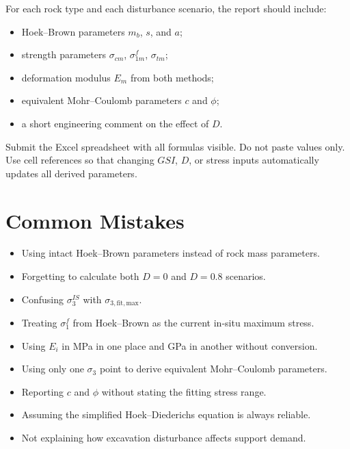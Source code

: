 \documentclass[a4paper,12pt]{article}
\begin{document}
\begin{calcbox}
For each rock type and each disturbance scenario, the report should include:
\begin{itemize}
    \item Hoek--Brown parameters \(m_b\), \(s\), and \(a\);
    \item strength parameters \(\sigma_{cm}\), \(\sigma_{1m}^f\), \(\sigma_{tm}\);
    \item deformation modulus \(E_m\) from both methods;
    \item equivalent Mohr--Coulomb parameters \(c\) and \(\phi\);
    \item a short engineering comment on the effect of \(D\).
\end{itemize}
\end{calcbox}

\begin{notebox}
Submit the Excel spreadsheet with all formulas visible. Do not paste values only. Use
cell references so that changing \(GSI\), \(D\), or stress inputs automatically updates all
derived parameters.
\end{notebox}

\section{Common Mistakes}

\begin{errbox}
\begin{itemize}
    \item Using intact Hoek--Brown parameters instead of rock mass parameters.
    \item Forgetting to calculate both \(D=0\) and \(D=0.8\) scenarios.
    \item Confusing \(\sigma_3^{IS}\) with \(\sigma_{3,\mathrm{fit,max}}\).
    \item Treating \(\sigma_1^f\) from Hoek--Brown as the current in-situ maximum stress.
    \item Using \(E_i\) in MPa in one place and GPa in another without conversion.
    \item Using only one \(\sigma_3\) point to derive equivalent Mohr--Coulomb parameters.
    \item Reporting \(c\) and \(\phi\) without stating the fitting stress range.
    \item Assuming the simplified Hoek--Diederichs equation is always reliable.
    \item Not explaining how excavation disturbance affects support demand.
\end{itemize}
\end{errbox}
\end{document}
